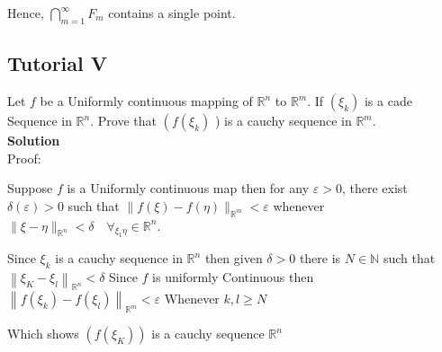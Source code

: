 \documentclass{article}
\begin{document}
Hence, $\bigcap_{m=1}^{\infty} F_{m}$ contains a single point.

\subsection{Tutorial V}
Let $f$ be a Uniformly continuous mapping of $\mathbb{R}^{n}$ to $\mathbb{R}^{m}$. If $\left(\xi_{k}\right)$ is a cade Sequence in $\mathbb{R}^{n}$. Prove that $\left(f\left(\xi_{k}\right)\right.$ ) is a cauchy sequence in $\mathbb{R}^{m}$.\\

\textbf{Solution}\\

Proof:

Suppose $f$ is a Uniformly continuous map then for any $\varepsilon>0$, 
there exist $\delta(\varepsilon)>0$ such that $\|f(\xi)-f(\eta)\|_{\mathbb{R}^{m}}<\varepsilon$ whenever $\|\xi-\eta\|_{\mathbb{R}^{n}}<\delta \quad \forall_{\xi_{1} \eta} \in \mathbb{R}^{n}$. 

Since $\xi_{k}$ is a cauchy sequence in $\mathbb{R}^{n}$ then given $\delta>0$ there is $N \in \mathbb{N}$ such that $\left\|\xi_{K}-\xi_{l}\right\|_{\mathbb{R}^{n}}<\delta$ Since $f$ is uniformly Continuous then $\left\|f\left(\xi_{k}\right)-f\left(\xi_{l}\right)\right\|_{\mathbb{R}^{m}}<\varepsilon$ Whenever $k, l \geq N$

Which shows $\left(f\left(\xi_{K}\right)\right)$ is a cauchy sequence $ \mathbb{R}^{n}$
\end{document}
